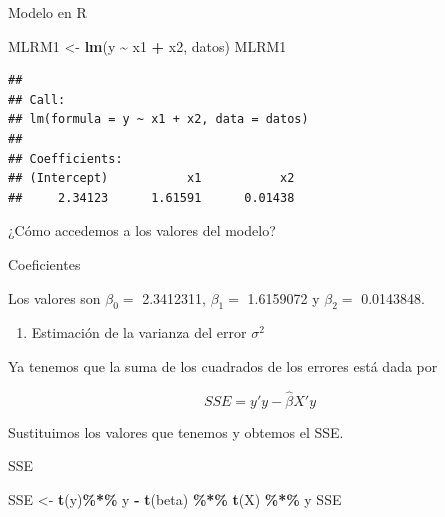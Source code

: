 \documentclass[
]{book}
\newenvironment{Shaded}{\begin{snugshade}}{\end{snugshade}}
\newcommand{\DecValTok}[1]{\textcolor[rgb]{0.00,0.00,0.81}{#1}}
\newcommand{\FunctionTok}[1]{\textcolor[rgb]{0.13,0.29,0.53}{\textbf{#1}}}
\newcommand{\NormalTok}[1]{#1}
\newcommand{\OtherTok}[1]{\textcolor[rgb]{0.56,0.35,0.01}{#1}}
\newcommand{\SpecialCharTok}[1]{\textcolor[rgb]{0.81,0.36,0.00}{\textbf{#1}}}
\providecommand{\tightlist}{%
  \setlength{\itemsep}{0pt}\setlength{\parskip}{0pt}}
\begin{document}
Modelo en R

\begin{Shaded}
\begin{Highlighting}[]
\NormalTok{MLRM1 }\OtherTok{\textless{}{-}} \FunctionTok{lm}\NormalTok{(y }\SpecialCharTok{\textasciitilde{}}\NormalTok{ x1 }\SpecialCharTok{+}\NormalTok{ x2, datos)}
\NormalTok{MLRM1 }
\end{Highlighting}
\end{Shaded}

\begin{verbatim}
## 
## Call:
## lm(formula = y ~ x1 + x2, data = datos)
## 
## Coefficients:
## (Intercept)           x1           x2  
##     2.34123      1.61591      0.01438
\end{verbatim}

¿Cómo accedemos a los valores del modelo?

Coeficientes

\begin{Shaded}
\end{Shaded}

Los valores son \(\beta_0=\) 2.3412311, \(\beta_1=\) 1.6159072 y \(\beta_2=\) 0.0143848.

\begin{enumerate}
\def\labelenumi{\arabic{enumi})}
\setcounter{enumi}{1}
\tightlist
\item
  Estimación de la varianza del error \(\sigma^2\)
\end{enumerate}

Ya tenemos que la suma de los cuadrados de los errores está dada por

\[ SSE = y'y - \hat{\beta}X'y\]

Sustituimos los valores que tenemos y obtemos el SSE.

SSE

\begin{Shaded}
\begin{Highlighting}[]
\NormalTok{SSE }\OtherTok{\textless{}{-}} \FunctionTok{t}\NormalTok{(y)}\SpecialCharTok{\%*\%}\NormalTok{ y }\SpecialCharTok{{-}} \FunctionTok{t}\NormalTok{(beta) }\SpecialCharTok{\%*\%} \FunctionTok{t}\NormalTok{(X) }\SpecialCharTok{\%*\%}\NormalTok{ y}
\NormalTok{SSE}
\end{Highlighting}
\end{Shaded}
\end{document}
